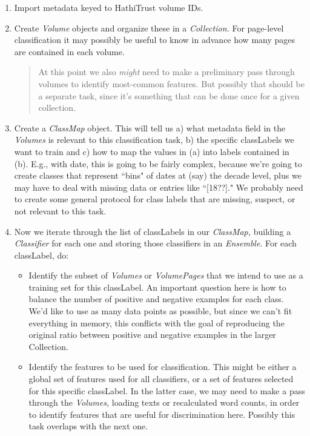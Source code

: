 \documentclass[12pt]{article}
\begin{document}
\begin{enumerate}

\item Import metadata keyed to HathiTrust volume IDs.
\item Create \emph{Volume} objects and organize these in a \emph{Collection.} For page-level classification it may possibly be useful to know in advance how many pages are contained in each volume. 
\begin{quote}
At this point we also \emph{might} need to make a preliminary pass through volumes to identify most-common features. But possibly that should be a separate task, since it's something that can be done once for a given collection.
\end{quote}
\item Create a \emph{ClassMap} object. This will tell us a) what metadata field in the \emph{Volumes} is relevant to this classification task, b) the specific classLabels we want to train and c) how to map the values in (a) into labels contained in (b). E.g., with date, this is going to be fairly complex, because we're going to create classes that represent ``bins" of dates at (say) the decade level, plus we may have to deal with missing data or entries like ``[18??]." We probably need to create some general protocol for class labels that are missing, suspect, or not relevant to this task.
\item Now we iterate through the list of classLabels in our \emph{ClassMap,} building a \emph{Classifier} for each one and storing those classifiers in an \emph{Ensemble}. For each classLabel, do:
\begin{itemize}
\item Identify the subset of \emph{Volumes} or \emph{VolumePages} that we intend to use as a training set for this classLabel. An important question here is how to balance the number of positive and negative examples for each class. We'd like to use as many data points as possible, but since we can't fit everything in memory, this conflicts with the goal of reproducing the original ratio between positive and negative examples in the larger Collection.
\item Identify the features to be used for classification. This might be either a global set of features used for all classifiers, or a set of features selected for this specific classLabel. In the latter case, we may need to make a pass through the \emph{Volumes,} loading texts or recalculated word counts, in order to identify features that are useful for discrimination here. Possibly this task overlaps with the next one.

\end{itemize}
\end{enumerate}
\end{document}
